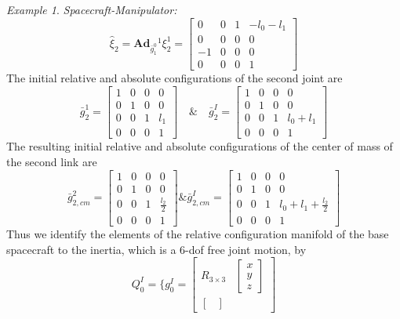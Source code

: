 \documentclass[lettersize,journal]{IEEEtran}
\def \Ad {\textbf{Ad}}
\theoremstyle{remark}
\newtheorem{example}{Example}[subsection]
\begin{document}
\begin{example}{\textit{Spacecraft-Manipulator:}}
\begin{equation*}
    \hat{\xi}_2=\Ad_{\bar{g}^0_{1}}{}^{1}{\xi}^{1}_2=\begin{bmatrix}0 &0 &1&-l_0-l_1 \\0 &0 &0& 0\\-1 & 0& 0&0 \\0 & 0 & 0 & 1
    \end{bmatrix}
\end{equation*}
The initial relative and absolute configurations of the second joint are
\begin{equation*}
    \bar{g}^1_2=\begin{bmatrix}1 &0 &0&0 \\0 &1 &0& 0\\0 & 0& 1&l_1 \\0 & 0 & 0 & 1
    \end{bmatrix} \quad \& \quad \bar{g}^I_2=\begin{bmatrix}1 &0 &0&0 \\0 &1 &0& 0\\0 & 0& 1&l_0+l_1 \\0 & 0 & 0 & 1
    \end{bmatrix}
\end{equation*}
The resulting initial relative and absolute configurations of the center of mass of the second link are
\begin{equation*}
    \bar{g}^2_{2,cm}=\begin{bmatrix}1 &0 &0&0 \\0 &1 &0& 0\\0 & 0& 1&\frac{l_2}{2} \\0 & 0 & 0 & 1
    \end{bmatrix}\& \bar{g}^I_{2,cm}=\begin{bmatrix}1 &0 &0&0 \\0 &1 &0& 0\\0 & 0& 1&l_0+l_1+\frac{l_2}{2} \\0 & 0 & 0 & 1
    \end{bmatrix}
\end{equation*}
Thus we identify the elements of the relative configuration manifold of the base spacecraft to the inertia, which is a 6-dof free joint motion, by
\begin{equation}
    Q^I_0=\Bigg\{g^I_0=\begin{bmatrix}
    R_{3 \times 3} & \begin{bmatrix}
    x \\ y \\ z
    \end{bmatrix}\\ \begin{bmatrix}

\end{bmatrix}
\end{bmatrix}
\end{equation}
\end{example}
\end{document}
